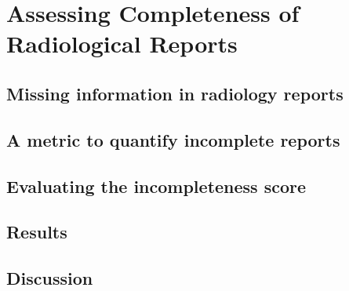 \chapter{Assessing Completeness of Radiological Reports}

\clearpage

\section{Missing information in radiology reports}

\clearpage

\section{A metric to quantify incomplete reports}

\clearpage

\section{Evaluating the incompleteness score}

\clearpage

\section{Results}

\clearpage

\section{Discussion}

\clearpage